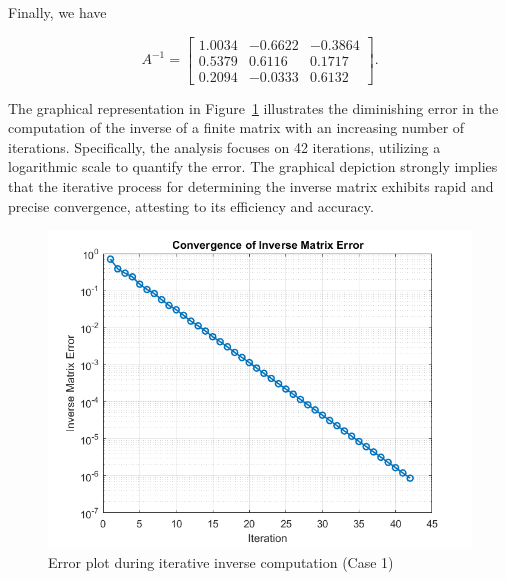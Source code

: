 \begin{example}
Finally, we have

\[ A^{-1} =
\begin{bmatrix}
    1.0034 & -0.6622 & -0.3864 \\
    0.5379 & 0.6116 & 0.1717 \\
    0.2094 & -0.0333 & 0.6132
\end{bmatrix}.
\]
\newline
\newline
\newline

The graphical representation in Figure~\ref{graph-inverse-01} illustrates the diminishing error in the computation of the inverse of a finite matrix with an increasing number of iterations. Specifically, the analysis focuses on 42 iterations, utilizing a logarithmic scale to quantify the error. The graphical depiction strongly implies that the iterative process for determining the inverse matrix exhibits rapid and precise convergence, attesting to its efficiency and accuracy.

\begin{center}
    \begin{figure}[h]
        \centering
        \includegraphics[width=0.7\linewidth]{Figures/for_the_first_one.png}
        \caption{Error plot during iterative inverse computation (Case 1)}
        \label{graph-inverse-01}
    \end{figure}
\end{center}

\end{example}
\newpage
